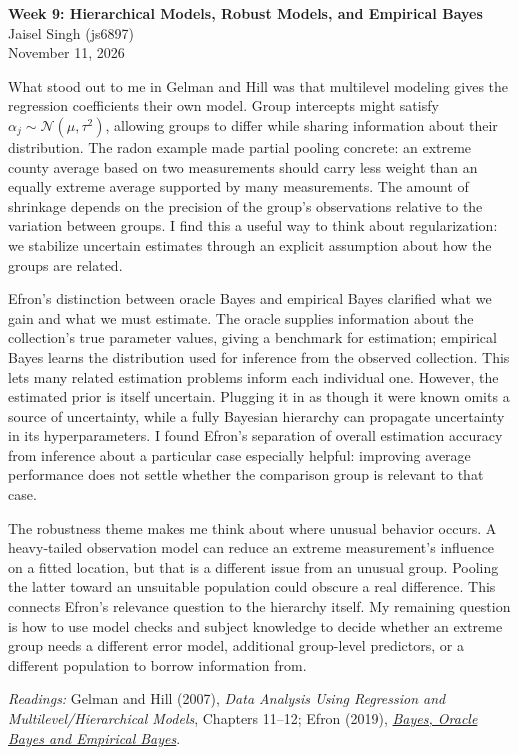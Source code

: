 \documentclass[12pt]{article}
\begin{document}
\begin{flushleft}
\textbf{Week 9: Hierarchical Models, Robust Models, and Empirical Bayes} \\
Jaisel Singh (js6897) \\
November 11, 2026
\end{flushleft}

\vspace{0.1in}

What stood out to me in Gelman and Hill was that multilevel modeling gives the
regression coefficients their own model. Group intercepts might satisfy
$\alpha_j\sim\mathcal{N}(\mu,\tau^2)$, allowing groups to differ while sharing
information about their distribution. The radon example made partial pooling
concrete: an extreme county average based on two measurements should carry less
weight than an equally extreme average supported by many measurements. The
amount of shrinkage depends on the precision of the group's observations
relative to the variation between groups. I find this a useful way to think
about regularization: we stabilize uncertain estimates through an explicit
assumption about how the groups are related.

Efron's distinction between oracle Bayes and empirical Bayes clarified what we
gain and what we must estimate. The oracle supplies information about the
collection's true parameter values, giving a benchmark for estimation; empirical
Bayes learns the distribution used for inference from the observed collection.
This lets many related estimation problems inform each individual one.
However, the estimated prior is itself uncertain. Plugging it in as though it
were known omits a source of uncertainty, while a fully Bayesian hierarchy can
propagate uncertainty in its hyperparameters. I found Efron's separation of
overall estimation accuracy from inference about a particular case especially
helpful: improving average performance does not settle whether the comparison
group is relevant to that case.

The robustness theme makes me think about where unusual behavior occurs. A
heavy-tailed observation model can reduce an extreme measurement's influence
on a fitted location, but that is a different issue from an unusual
group. Pooling the latter toward an unsuitable population could obscure a real
difference. This connects Efron's relevance question to the hierarchy itself.
My remaining question is how to use model checks and subject knowledge to
decide whether an extreme group needs a different error model, additional
group-level predictors, or a different population to borrow information from.

\vspace{0.05in}
{\footnotesize
\textit{Readings:} Gelman and Hill (2007), \emph{Data Analysis Using Regression and Multilevel/Hierarchical Models}, Chapters 11--12;
Efron (2019), \href{https://doi.org/10.1214/18-STS674}{\emph{Bayes, Oracle Bayes and Empirical Bayes}}.
\par}
\end{document}
